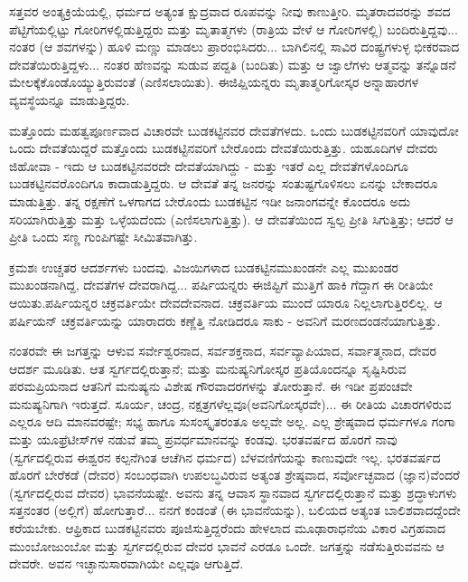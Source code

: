 ಸತ್ತವರ ಅಂತ್ಯಕ್ರಿಯೆಯಲ್ಲಿ, ಧರ್ಮದ ಅತ್ಯಂತ ಕ್ಷುದ್ರವಾದ ರೂಪವನ್ನು ನೀವು ಕಾಣುತ್ತೀರಿ. ಮೃತರಾದವರನ್ನು ಶವದ ಪೆಟ್ಟಿಗೆಯಲ್ಲಿಟ್ಟು ಗೋರಿಗಳಲ್ಲಿಡುತ್ತಿದ್ದರು ಮತ್ತು ಮೃತಾತ್ಮಗಳು (ರಾತ್ರಿಯ ವೇಳೆ ಆ ಗೋರಿಗಳಲ್ಲಿ) ಬಂದಿರುತ್ತಿದ್ದವು... ನಂತರ (ಆ ಶವಗಳನ್ನು) ಹೂಳಿ ಮಣ್ಣು ಮಾಡಲು ಪ್ರಾರಂಭಿಸಿದರು... ಬಾಗಿಲಿನಲ್ಲಿ ಸಾವಿರ ದಂಷ್ಟ್ರಗಳುಳ್ಳ ಭೀಕರವಾದ ದೇವತೆಯಿರುತ್ತಿದ್ದಳು... ನಂತರ ಹೆಣವನ್ನು ಸುಡುವ ಪದ್ದತಿ (ಬಂದಿತು) ಮತ್ತು ಆ ಜ್ವಾಲೆಗಳು ಆತ್ಮವನ್ನು ತನ್ನೊಡನೆ ಮೇಲಕ್ಕೆ\break ಕೊಂಡೊಯ್ಯುತ್ತಿರುವಂತೆ (ಎಣಿಸಲಾಯಿತು). ಈಜಿಪ್ಷಿಯನ್ನರು ಮೃತಾತ್ಮರಿಗೋಸ್ಕರ ಅನ್ನಾಹಾರಗಳ ವ್ಯವಸ್ಥೆಯನ್ನೂ ಮಾಡುತ್ತಿದ್ದರು.

ಮತ್ತೊಂದು ಮಹತ್ವಪೂರ್ಣವಾದ ವಿಚಾರವೇ ಬುಡಕಟ್ಟಿನವರ ದೇವತೆಗಳದು. ಒಂದು ಬುಡಕಟ್ಟಿನವರಿಗೆ ಯಾವುದೋ ಒಂದು ದೇವತೆಯಿದ್ದರೆ ಮತ್ತೊಂದು ಬುಡಕಟ್ಟಿನವರಿಗೆ ಬೇರೊಂದು ದೇವತೆಯಿರುತ್ತಿತ್ತು. ಯಹೂದಿಗಳ ದೇವರು ಜಿಹೋವಾ - ಇದು ಆ ಬುಡಕಟ್ಟಿನವರದೇ ದೇವತೆಯಾಗಿದ್ದು - ಮತ್ತು ಇತರೆ ಎಲ್ಲ ದೇವತೆಗಳೊಂದಿಗೂ ಬುಡಕಟ್ಟಿನವರೊಂದಿಗೂ ಕಾದಾಡುತ್ತಿದ್ದರು. ಆ ದೇವತೆ ತನ್ನ ಜನರನ್ನು ಸಂತುಷ್ಟಗೊಳಿಸಲು ಏನನ್ನು ಬೇಕಾದರೂ ಮಾಡುತ್ತಿತ್ತು. ತನ್ನ ರಕ್ಷಣೆಗೆ ಒಳಗಾಗದ ಬೇರೊಂದು ಬುಡಕಟ್ಟಿನ ಇಡೀ ಜನಾಂಗವನ್ನೇ ಕೊಂದರೂ ಅದು ಸರಿಯಾಗಿರುತ್ತಿತ್ತು ಮತ್ತು ಒಳ್ಳೆಯದೆಂದು (ಎಣಿಸಲಾಗುತ್ತಿತ್ತು). ಆ ದೇವತೆಯಿಂದ ಸ್ವಲ್ಪ ಪ್ರೀತಿ ಸಿಗುತ್ತಿತ್ತು; ಆದರೆ ಆ ಪ್ರೀತಿ ಒಂದು ಸಣ್ಣ ಗುಂಪಿಗಷ್ಟೇ ಸೀಮಿತವಾಗಿತ್ತು.

ಕ್ರಮಶಃ ಉಚ್ಚತರ ಆದರ್ಶಗಳು ಬಂದವು. ವಿಜಯಿಗಳಾದ ಬುಡಕಟ್ಟಿನ\break ಮುಖಂಡನೇ ಎಲ್ಲ ಮುಖಂಡರ ಮುಖಂಡನಾಗಿದ್ದ, ದೇವತೆಗಳ ದೇವರಾಗಿದ್ದ... ಪರ್ಷಿಯನ್ನರು ಈಜಿಪ್ಟಿಗೆ ಮುತ್ತಿಗೆ ಹಾಕಿ ಗೆದ್ದಾಗ ಈ ರೀತಿಯೇ ಆಯಿತು.\break ಪರ್ಷಿಯನ್ನರ ಚಕ್ರವರ್ತಿಯೇ ದೇವದೇವನಾದ. ಚಕ್ರವರ್ತಿಯ ಮುಂದೆ ಯಾರೂ ನಿಲ್ಲಲಾಗುತ್ತಿರಲಿಲ್ಲ. ಆ ಪರ್ಷಿಯನ್ ಚಕ್ರವರ್ತಿಯನ್ನು ಯಾರಾದರು ಕಣ್ಣೆತ್ತಿ ನೋಡಿದರೂ ಸಾಕು - ಅವನಿಗೆ ಮರಣದಂಡನೆಯಾಗುತ್ತಿತ್ತು.

ನಂತರವೇ ಈ ಜಗತ್ತನ್ನು ಆಳುವ ಸರ್ವೇಶ್ವರನಾದ, ಸರ್ವಶಕ್ತನಾದ, ಸರ್ವವ್ಯಾಪಿಯಾದ, ಸರ್ವಾತ್ಮನಾದ, ದೇವರ ಆದರ್ಶ ಮೂಡಿತು. ಆತ ಸ್ವರ್ಗದಲ್ಲಿರುತ್ತಾನೆ; ಮತ್ತು ಮನುಷ್ಯನಿಗೋಸ್ಕರ ಪ್ರತಿಯೊಂದನ್ನೂ ಸೃಷ್ಟಿಸಿರುವ ಪರಮಪ್ರಿಯನಾದ ಆತನಿಗೆ ಮನುಷ್ಯನು ವಿಶೇಷ ಗೌರವಾದರಗಳನ್ನು ತೋರುತ್ತಾನೆ. ಈ ಇಡೀ ಪ್ರಪಂಚವೇ ಮನುಷ್ಯನಿಗಾಗಿ ಇರುತ್ತದೆ. ಸೂರ್ಯ, ಚಂದ್ರ, ನಕ್ಷತ್ರಗಳೆಲ್ಲವೂ\break (ಅವನಿಗೋಸ್ಕರವೇ)... ಈ ರೀತಿಯ ವಿಚಾರಗಳಿರುವ ಎಲ್ಲರೂ ಆದಿ ಮಾನವರಷ್ಟೇ; ಸಭ್ಯ ಹಾಗೂ ಸುಸಂಸ್ಕೃತರಂತೂ ಅಲ್ಲವೇ ಅಲ್ಲ. ಎಲ್ಲ ಶ್ರೇಷ್ಠವಾದ ಧರ್ಮಗಳೂ ಗಂಗಾ ಮತ್ತು ಯೂಫ್ರೆಟೀಸ್‌ಗಳ ನಡುವೆ ತಮ್ಮ ಪ್ರವರ್ಧಮಾನವನ್ನು ಕಂಡವು. ಭರತವರ್ಷದ ಹೊರಗೆ ನಾವು (ಸ್ವರ್ಗದಲ್ಲಿರುವ ಈಶ್ವರನ ಕಲ್ಪನೆಗಿಂತ ಆಚೆಗಿನ ಧರ್ಮದ) ಬೆಳವಣಿಗೆಯನ್ನು ಕಾಣುವುದೇ ಇಲ್ಲ. ಭರತವರ್ಷದ ಹೊರಗೆ ಬೇರೆಕಡೆ (ದೇವರ) ಸಂಬಂಧವಾಗಿ ಉಪಲಬ್ಧವಿರುವ ಅತ್ಯಂತ ಶ್ರೇಷ್ಠವಾದ, ಸರ್ವೋಚ್ಛವಾದ (ಜ್ಞಾನ)ವೆಂದರೆ (ಸ್ವರ್ಗದಲ್ಲಿರುವ ದೇವರ) ಭಾವನೆಯಷ್ಟೇ. ಅವನು ತನ್ನ ಆವಾಸ ಸ್ಥಾನವಾದ ಸ್ವರ್ಗದಲ್ಲಿರುತ್ತಾನೆ ಮತ್ತು ಶ್ರದ್ಧಾಳುಗಳು ಸತ್ತನಂತರ (ಅಲ್ಲಿಗೆ) ಹೋಗುತ್ತಾರೆ... ನನಗೆ ಕಂಡಂತೆ (ಈ ಭಾವನೆಯನ್ನು), ಬಲಿಯದ ಅತ್ಯಂತ ಬಾಲಿಶವಾದದ್ದೆಂದೇ ಕರೆಯಬೇಕು. ಆಫ್ರಿಕಾದ ಬುಡಕಟ್ಟಿನವರು ಪೂಜಿಸುತ್ತಿದ್ದರೆಂದು ಹೇಳಲಾದ ಮೂಢಾರಾಧನೆಯ ವಿಕಾರ ವಿಗ್ರಹವಾದ ಮುಂಬೋಜುಂಬೋ ಮತ್ತು ಸ್ವರ್ಗದಲ್ಲಿರುವ ದೇವರ ಭಾವನೆ ಎರಡೂ ಒಂದೇ. ಜಗತ್ತನ್ನು ನಡೆಸುತ್ತಿರುವವನು ಆ ದೇವರೇ. ಅವನ ಇಚ್ಛಾನುಸಾರವಾಗಿಯೇ ಎಲ್ಲವೂ ಆಗುತ್ತಿದೆ.

